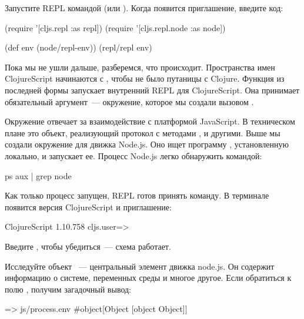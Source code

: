 Запустите REPL командой  (или ). Когда появится приглашение, введите код:

\begin{english}
  \begin{clojure}
(require '[cljs.repl :as repl])
(require '[cljs.repl.node :as node])

(def env (node/repl-env))
(repl/repl env)
  \end{clojure}
\end{english}

Пока мы не ушли дальше, разберемся, что происходит. Пространства имен ClojureScript начинаются с , чтобы не было путаницы с Clojure. Функция  из последней формы запускает внутренний REPL для ClojureScript. Она принимает обязательный аргумент~--- окружение, которое мы создали вызовом .

Окружение отвечает за взаимодействие с платформой JavaScript. В техническом плане это объект, реализующий протокол  с методами ,  и другими. Выше мы создали окружение для движка Node.js. Оно ищет программу , установленную локально, и запускает ее. Процесс Node.js легко обнаружить командой:

\begin{english}
  \begin{bash}
ps aux | grep node
  \end{bash}
\end{english}

Как только процесс запущен, REPL готов принять команду. В терминале появится версия ClojureScript и приглашение:

\begin{english}
  \begin{text}
ClojureScript 1.10.758
cljs.user=>
  \end{text}
\end{english}

Введите , чтобы убедиться~--- схема работает.

Исследуйте объект ~--- центральный элемент движка node.js. Он содержит информацию о системе, переменных среды и многое другое. Если обратиться к полю , получим загадочный вывод:

\begin{english}
  \begin{clojure}
=> js/process.env
#object[Object [object Object]]
  \end{clojure}
\end{english}

